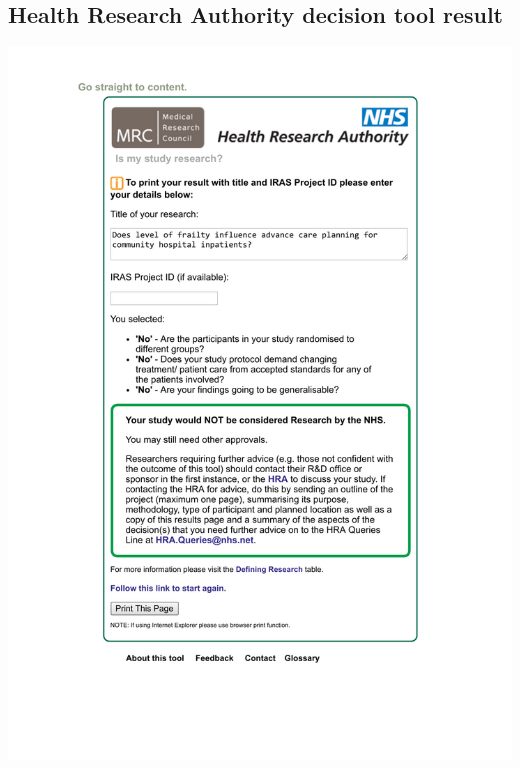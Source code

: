 \documentclass
[
	12pt,
	a4paper,
	oneside,
]{article}
\begin{document}
\begin{appendix}
\section{Health Research Authority decision tool result}
\label{appendix:hra}
\includegraphics[width=\textwidth]{hraresult.pdf}



\end{appendix}
\end{document}
